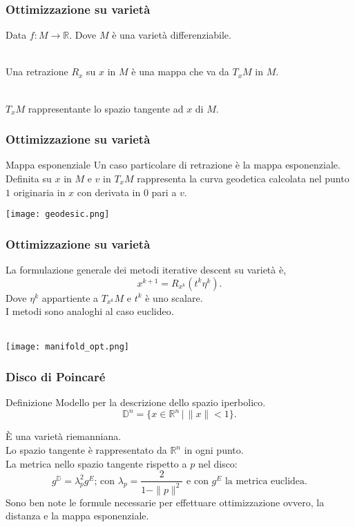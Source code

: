 \documentclass{beamer}
\begin{document}
\begin{frame}
\frametitle{Ottimizzazione su varietà}
Data $f : M \to \mathbb{R}$.
Dove $M$ è una varietà differenziabile.\\~\

Una \alert{retrazione} $R_x$ su $x$ in $M$ è una mappa che va da $T_xM$ in $M$.\\~\

$T_xM$ rappresentante lo spazio tangente ad $x$ di $M$.
\end{frame}

\begin{frame}
\frametitle{Ottimizzazione su varietà}
\begin{beamerboxesrounded}{Mappa esponenziale}
Un caso particolare di retrazione è la \textbf{}{mappa esponenziale}.\\
Definita su $x$ in $M$ e $v$ in $T_xM$ rappresenta la curva \alert{geodetica} calcolata nel punto $1$ originaria in $x$ con derivata in $0$ pari a $v$.
\end{beamerboxesrounded}
\begin{center}
    \texttt{[image: geodesic.png]} 
\end{center}
\end{frame}

\begin{frame}
\frametitle{Ottimizzazione su varietà}
La formulazione generale dei metodi iterative descent su varietà è,\\
\[x^{k+1} = R_{x^k}(t^k \eta^k).\]
Dove $\eta^k$ appartiente a $T_{x^k}M$ e $t^k$ è uno scalare.\\
I metodi sono analoghi al caso euclideo.\\~\
\begin{center}
    \texttt{[image: manifold\_opt.png]} 
\end{center}
\end{frame}

\begin{frame}
\frametitle{Disco di Poincaré}
\begin{beamerboxesrounded}{Definizione}
Modello per la descrizione dello spazio iperbolico.\\
\[ \mathbb{D}^n = \{x \in \mathbb{R}^n \, | \, \| x \| < 1\}. \]
\end{beamerboxesrounded}
\bigskip
\`E una \alert{varietà riemanniana}.\\
Lo spazio tangente è rappresentato da $\mathbb{R}^n$ in ogni punto.\\
La \alert{metrica} nello spazio tangente rispetto a $p$ nel disco:
\[ g^\mathbb{D} = \lambda_p^2 g^E \mbox{; con } \lambda_p = \frac{2}{1- \| p \|^2} \mbox{ e con } g^E \mbox{ la metrica euclidea}. \]
Sono ben note le formule necessarie per effettuare ottimizzazione ovvero, la \alert{distanza} e la \alert{mappa esponenziale}.
\end{frame}
\end{document}
